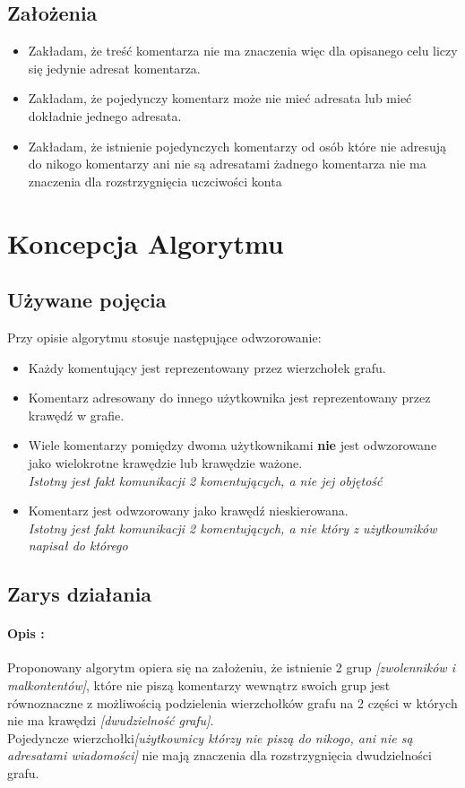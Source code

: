 \documentclass[11pt]{article}
\newcommand{\+}{\discretionary{\mbox{\scriptsize$\hookleftarrow$}}{}{}}
\begin{document}
\subsection{Założenia}
\begin{itemize}
\item
Zakładam, że treść komentarza nie ma znaczenia więc dla opisanego celu liczy się jedynie adresat komentarza.
\item
Zakładam, że pojedynczy komentarz może nie mieć adresata lub mieć dokładnie jednego adresata.
\item
Zakładam, że istnienie pojedynczych komentarzy od osób które nie adresują do nikogo komentarzy ani nie są adresatami żadnego komentarza nie ma znaczenia dla rozstrzygnięcia uczciwości konta
\end{itemize}

\section{Koncepcja Algorytmu}
\subsection{Używane pojęcia}
Przy opisie algorytmu stosuje następujące odwzorowanie:
\begin{itemize}
\item
Każdy komentujący jest reprezentowany przez wierzchołek grafu.
\item
Komentarz adresowany do innego użytkownika jest reprezentowany przez krawędź w grafie.
\item
Wiele komentarzy pomiędzy dwoma użytkownikami \textbf{nie} jest odwzorowane jako wielokrotne krawędzie lub krawędzie ważone.\\
 \textsl{Istotny jest fakt komunikacji 2 komentujących, a nie jej objętość}
\item
Komentarz jest odwzorowany jako krawędź nieskierowana. \\
\textsl{Istotny jest fakt komunikacji 2 komentujących, a nie który z użytkowników napisał do którego}
\end{itemize}
\subsection{Zarys działania}
\paragraph{Opis :\\}
   Proponowany algorytm opiera się na założeniu, że istnienie 2 grup \textsl{[zwolenników i malkontentów]}, które nie piszą komentarzy wewnątrz swoich grup jest równoznaczne z możliwością podzielenia wierzchołków grafu na 2 części w których nie ma krawędzi \textsl{[dwudzielność grafu]}.\\ Pojedyncze wierzchołki\textsl{[użytkownicy którzy nie piszą do nikogo, ani nie są adresatami wiadomości]} nie mają znaczenia dla rozstrzygnięcia dwudzielności grafu.
\end{document}
